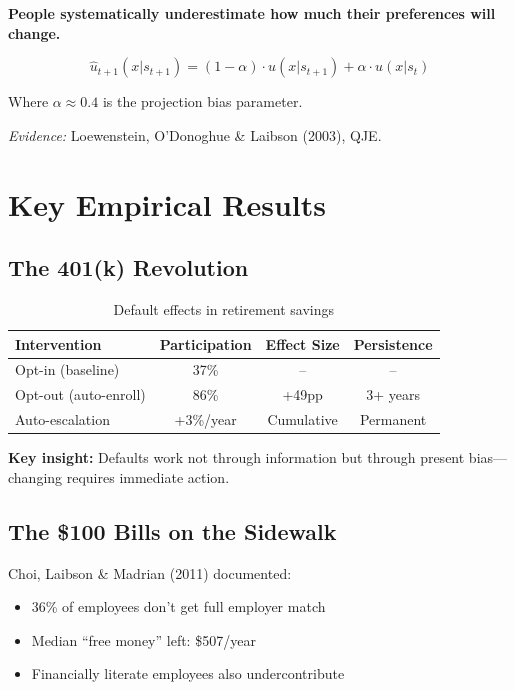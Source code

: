 \begin{tcolorbox}[colback=red!5!white,colframe=red!75!black,title=Axiom LA-6: Projection Bias]
\textbf{People systematically underestimate how much their preferences will change.}

\begin{equation}
\hat{u}_{t+1}(x | s_{t+1}) = (1-\alpha) \cdot u(x | s_{t+1}) + \alpha \cdot u(x | s_t)
\end{equation}

Where $\alpha \approx 0.4$ is the projection bias parameter.

\textit{Evidence:} Loewenstein, O'Donoghue \& Laibson (2003), QJE.
\end{tcolorbox}

\section{Key Empirical Results}

\subsection{The 401(k) Revolution}

\begin{table}[h]
\centering
\begin{tabular}{lccc}
\hline
\textbf{Intervention} & \textbf{Participation} & \textbf{Effect Size} & \textbf{Persistence} \\
\hline
Opt-in (baseline) & 37\% & -- & -- \\
Opt-out (auto-enroll) & 86\% & +49pp & 3+ years \\
Auto-escalation & +3\%/year & Cumulative & Permanent \\
\hline
\end{tabular}
\caption{Default effects in retirement savings}
\end{table}

\textbf{Key insight:} Defaults work not through information but through present bias---changing requires immediate action.

\subsection{The \$100 Bills on the Sidewalk}

Choi, Laibson \& Madrian (2011) documented:
\begin{itemize}
    \item 36\% of employees don't get full employer match
    \item Median ``free money'' left: \$507/year
    \item Financially literate employees also undercontribute
\end{itemize}

